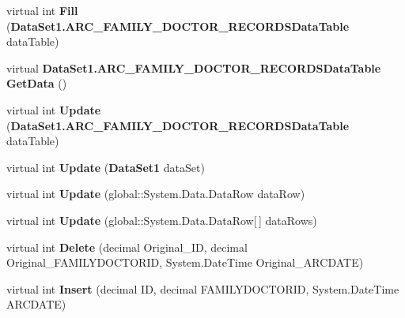 \begin{CompactItemize}
\item 
virtual int \textbf{Fill} ({\bf DataSet1.ARC\_\-FAMILY\_\-DOCTOR\_\-RECORDSDataTable} dataTable)\label{class_automatic_medical_system_1_1_data_set1_table_adapters_1_1_a_r_c___f_a_m_i_l_y___d_o_c_t_o_r___r_e_c_o_r_d_s_table_adapter_866221361c74c5de4fd848f5066b8d2e}

\item 
virtual {\bf DataSet1.ARC\_\-FAMILY\_\-DOCTOR\_\-RECORDSDataTable} \textbf{GetData} ()\label{class_automatic_medical_system_1_1_data_set1_table_adapters_1_1_a_r_c___f_a_m_i_l_y___d_o_c_t_o_r___r_e_c_o_r_d_s_table_adapter_295e0e30c55da139ed1fc78be0c5fcb1}

\item 
virtual int \textbf{Update} ({\bf DataSet1.ARC\_\-FAMILY\_\-DOCTOR\_\-RECORDSDataTable} dataTable)\label{class_automatic_medical_system_1_1_data_set1_table_adapters_1_1_a_r_c___f_a_m_i_l_y___d_o_c_t_o_r___r_e_c_o_r_d_s_table_adapter_83e8040eb1fe744fc954ff098c68db61}

\item 
virtual int \textbf{Update} ({\bf DataSet1} dataSet)\label{class_automatic_medical_system_1_1_data_set1_table_adapters_1_1_a_r_c___f_a_m_i_l_y___d_o_c_t_o_r___r_e_c_o_r_d_s_table_adapter_2d211543443b2955f7299101cf3165d1}

\item 
virtual int \textbf{Update} (global::System.Data.DataRow dataRow)\label{class_automatic_medical_system_1_1_data_set1_table_adapters_1_1_a_r_c___f_a_m_i_l_y___d_o_c_t_o_r___r_e_c_o_r_d_s_table_adapter_6c1a4b9ed441de46345741c9592deb7f}

\item 
virtual int \textbf{Update} (global::System.Data.DataRow[$\,$] dataRows)\label{class_automatic_medical_system_1_1_data_set1_table_adapters_1_1_a_r_c___f_a_m_i_l_y___d_o_c_t_o_r___r_e_c_o_r_d_s_table_adapter_b17099cb53c68e43e88a3e3885611606}

\item 
virtual int \textbf{Delete} (decimal Original\_\-ID, decimal Original\_\-FAMILYDOCTORID, System.DateTime Original\_\-ARCDATE)\label{class_automatic_medical_system_1_1_data_set1_table_adapters_1_1_a_r_c___f_a_m_i_l_y___d_o_c_t_o_r___r_e_c_o_r_d_s_table_adapter_d0bce02086c4630bd8a0a7ba5cc96bab}

\item 
virtual int \textbf{Insert} (decimal ID, decimal FAMILYDOCTORID, System.DateTime ARCDATE)\label{class_automatic_medical_system_1_1_data_set1_table_adapters_1_1_a_r_c___f_a_m_i_l_y___d_o_c_t_o_r___r_e_c_o_r_d_s_table_adapter_e2c955a5f18243926677a473cb8a5444}


\end{CompactItemize}
